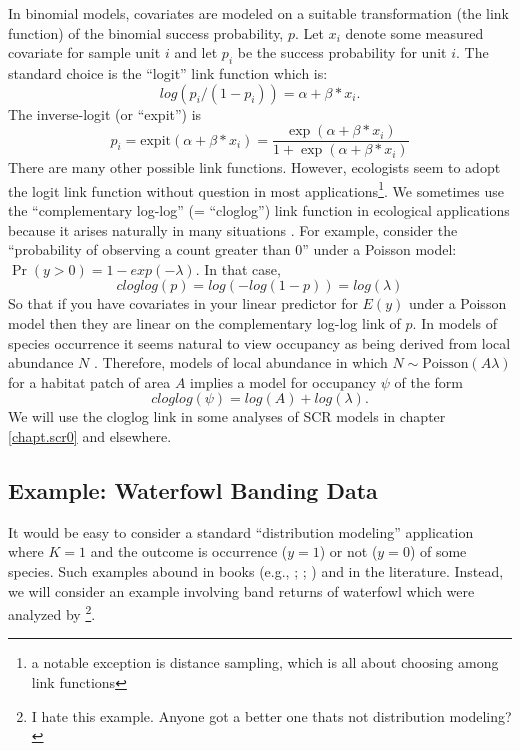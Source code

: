In binomial models, covariates are modeled on a suitable
transformation (the link function) of the binomial success
probability, $p$.  Let $x_{i}$ denote some measured covariate for
sample unit $i$ and let $p_{i}$ be the success probability for unit $i$.
The standard choice is the ``logit'' link function which is:
\[
log(p_i/(1-p_i)) = \alpha + \beta*x_{i}.
\]
The inverse-logit (or ``expit'') is
\[
p_{i} = \mbox{expit}(\alpha + \beta*x_{i}) =
 \frac{ \exp(\alpha + \beta*x_{i})}
      {1 + \exp(\alpha + \beta*x_{i} ) }
\]
There are many other possible link functions. However, ecologists seem
to adopt the logit link function without question in most
applications\footnote{a notable exception is distance sampling, which
  is all about choosing among link functions}.  We sometimes use the
``complementary log-log'' (= ``cloglog'') link function in ecological
applications because it arises naturally in many situations
\citep[][p. 150]{royle_dorazio:2008}. For example, consider the
``probability of observing a count greater than 0'' under a Poisson
model: $\Pr(y>0) = 1-exp(- \lambda)$. In that case,
\[
cloglog(p) =log(- log(1-p)) = log(\lambda)
\]
So that if you have covariates in your linear predictor for $E(y)$
under a Poisson model then they are linear on the complementary
log-log link of $p$.
In models of species occurrence it seems natural to view occupancy as
being derived from local abundance $N$
\citep{royle_nichols:2003,royle_dorazio:2006,dorazio:2007}.
Therefore,
models of local abundance in which $N \sim \mbox{Poisson}(A \lambda)$
for a habitat patch of area $A$ implies a model for occupancy $\psi$
of the form
\[
 cloglog(\psi) = log(A) + log(\lambda).
\]
We will use the cloglog link in some analyses of
SCR models in chapter \ref{chapt.scr0} and elsewhere.


\subsection{ Example: Waterfowl Banding Data}

It would be easy to consider a standard ``distribution modeling''
application where $K=1$ and the outcome is occurrence ($y=1$) or not
($y=0$) of some species. Such examples abound in books (e.g.,
\citet[][ch. 3]{royle_dorazio:2008}; \citet[][ch. 21]{kery:2010};
\citet[][ch. 13]{kery_schaub:2011}) and in the literature.
Instead, we will
consider an example involving band returns of waterfowl which were
analyzed by \citet{royle_dubovsky:2001}\footnote{I hate this example.
  Anyone got a better one thats not distribution modeling?}.

